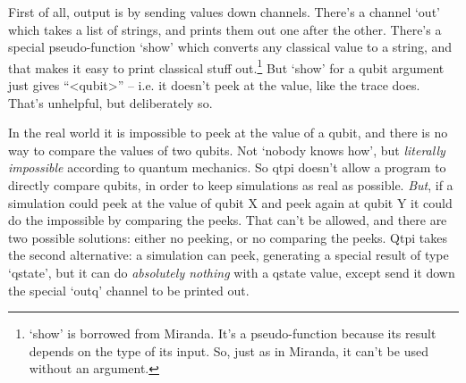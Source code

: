 First of all, output is by sending values down channels. There's a channel `out' which takes a list of strings, and prints them out one after the other. There's a special pseudo-function `show' which converts any classical value to a string, and that makes it easy to print classical stuff out.\footnote{`show' is borrowed from Miranda. It's a pseudo-function because its result depends on the type of its input. So, just as in Miranda, it can't be used without an argument.} But `show' for a qubit argument just gives ``\textless{}qubit\textgreater{}'' -- i.e. it doesn't peek at the value, like the trace does. That's unhelpful, but deliberately so.

In the real world it is impossible to peek at the value of a qubit, and there is no way to compare the values of two qubits. Not `nobody knows how', but \emph{literally impossible} according to quantum mechanics. So qtpi doesn't allow a program to directly compare qubits, in order to keep simulations as real as possible. \emph{But}, if a simulation could peek at the value of qubit X and peek again at qubit Y it could do the impossible by comparing the peeks. That can't be allowed, and there are two possible solutions: either no peeking, or no comparing the peeks. Qtpi takes the second alternative: a simulation can peek, generating a special result of type `qstate', but it can do \emph{absolutely nothing} with a qstate value, except send it down the special `outq' channel to be printed out. 

